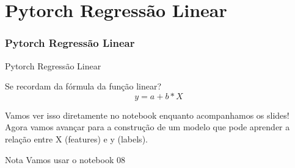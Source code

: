 \documentclass{beamer}
\begin{document}
\section{Pytorch Regressão Linear}

\begin{frame}
	\frametitle{Pytorch Regressão Linear}
	\begin{block}{Pytorch Regressão Linear}
		
		Se recordam da fórmula da função linear? 
		$$y = a + b*X$$
		
		Vamos ver isso diretamente no notebook enquanto acompanhamos os slides! \\
		Agora vamos avançar para a construção de um modelo que pode aprender a relação entre X (features) e y (labels).
	\end{block}
\begin{alertblock}{Nota}
	Vamos usar o notebook 08
\end{alertblock}
\end{frame}
\end{document}
